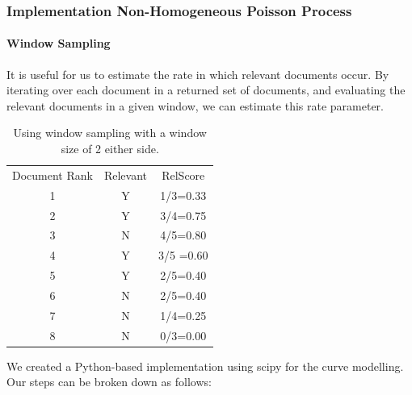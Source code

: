 \subsubsection{Implementation Non-Homogeneous Poisson Process} \label{imp_non_hom}

\paragraph{Window Sampling} \label{window_samp}

It is useful for us to estimate the rate in which relevant documents occur. By iterating over each document in a returned set of documents, and evaluating the relevant documents in a given window, we can estimate this rate parameter. 

\begin{table}[H]

\centering
\begin{tabular}{|c|c|c|} 
\hline
 Document Rank & Relevant & RelScore  \\ 
 1 & Y &			1/3=0.33 \\ 
 2 & Y &			3/4=0.75 \\ 
 3 & N &			4/5=0.80 \\ 
 4 & Y &			3/5 =0.60 \\ 
 5 & Y &			2/5=0.40 \\ 
 6 & N &			2/5=0.40 \\ 
 7 & N &			1/4=0.25 \\
 8 & N &			0/3=0.00 \\
  
 \hline
\end{tabular}

\caption{Using window sampling with a window size of 2 either side.}

\end{table}

We created a Python-based implementation using scipy for the curve modelling. Our steps can be broken down as follows:

